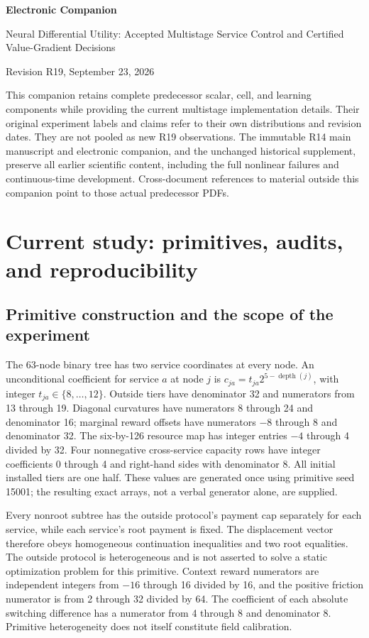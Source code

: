 \documentclass[11pt,letterpaper]{article}
\theoremstyle{definition}
\newcommand{\1}{\mathbf 1}
\begin{document}
\begin{center}{\Large\bfseries Electronic Companion\par}\medskip
{\large Neural Differential Utility: Accepted Multistage Service Control and Certified Value-Gradient Decisions\par}\medskip
Revision R19, September 23, 2026
\end{center}
This companion retains complete predecessor scalar, cell, and learning components while providing the current multistage implementation details. Their original experiment labels and claims refer to their own distributions and revision dates. They are not pooled as new R19 observations. The immutable R14 main manuscript and electronic companion, and the unchanged historical supplement, preserve all earlier scientific content, including the full nonlinear failures and continuous-time development. Cross-document references to material outside this companion point to those actual predecessor PDFs.

\section{Current study: primitives, audits, and reproducibility}\label{ec:r19-details}
\subsection{Primitive construction and the scope of the experiment}
The 63-node binary tree has two service coordinates at every node. An unconditional coefficient for service $a$ at node $j$ is $c_{ja}=t_{ja}2^{5-\operatorname{depth}(j)}$, with integer $t_{ja}\in\{8,\ldots,12\}$. Outside tiers have denominator 32 and numerators from 13 through 19. Diagonal curvatures have numerators 8 through 24 and denominator 16; marginal reward offsets have numerators $-8$ through 8 and denominator 32. The six-by-126 resource map has integer entries $-4$ through 4 divided by 32. Four nonnegative cross-service capacity rows have integer coefficients 0 through 4 and right-hand sides with denominator 8. All initial installed tiers are one half. These values are generated once using primitive seed 15001; the resulting exact arrays, not a verbal generator alone, are supplied.

Every nonroot subtree has the outside protocol's payment cap separately for each service, while each service's root payment is fixed. The displacement vector therefore obeys homogeneous continuation inequalities and two root equalities. The outside protocol is heterogeneous and is not asserted to solve a static optimization problem for this primitive. Context reward numerators are independent integers from $-16$ through 16 divided by 16, and the positive friction numerator is from 2 through 32 divided by 64. The coefficient of each absolute switching difference has a numerator from 4 through 8 and denominator 8. Primitive heterogeneity does not itself constitute field calibration.
\end{document}
